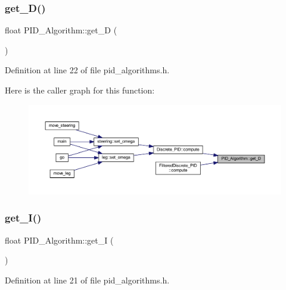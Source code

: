 \subsubsection{\texorpdfstring{get\_D()}{get\_D()}}
{\footnotesize\ttfamily float P\+I\+D\+\_\+\+Algorithm\+::get\+\_\+D (\begin{DoxyParamCaption}{ }\end{DoxyParamCaption})\hspace{0.3cm}{\ttfamily [inline]}}



Definition at line 22 of file pid\+\_\+algorithms.\+h.

Here is the caller graph for this function\+:
\nopagebreak
\begin{figure}[H]
\begin{center}
\leavevmode
\includegraphics[width=350pt]{class_p_i_d___algorithm_a5a113c3d88ee8af75af7248fb590f538_icgraph}
\end{center}
\end{figure}
\mbox{\label{class_p_i_d___algorithm_a6305260cd346415953b41fb765d33740}} 
\subsubsection{\texorpdfstring{get\_I()}{get\_I()}}
{\footnotesize\ttfamily float P\+I\+D\+\_\+\+Algorithm\+::get\+\_\+I (\begin{DoxyParamCaption}{ }\end{DoxyParamCaption})\hspace{0.3cm}{\ttfamily [inline]}}



Definition at line 21 of file pid\+\_\+algorithms.\+h.

